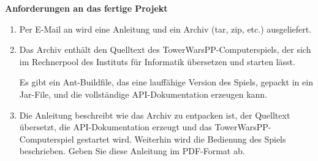 \textbf{Anforderungen an das fertige Projekt}
\begin{enumerate}
\item Per E-Mail an  wird eine Anleitung und ein Archiv (tar, zip, etc.) ausgeliefert.
\item Das Archiv enthält den Quelltext des TowerWarsPP-Computerspiels, der sich im Rechnerpool des Instituts für Informatik übersetzen und starten lässt.

Es gibt ein Ant-Buildfile, das eine lauffähige Version des Spiels, gepackt in ein Jar-File, und die vollständige API-Dokumentation erzeugen kann.
\item Die Anleitung beschreibt wie das Archiv zu entpacken ist, der Quelltext übersetzt, die API-Dokumentation erzeugt und das TowerWarsPP-Computerspiel gestartet wird. Weiterhin wird die Bedienung des Spiels beschrieben. Geben Sie diese Anleitung im PDF-Format ab.
\end{enumerate}